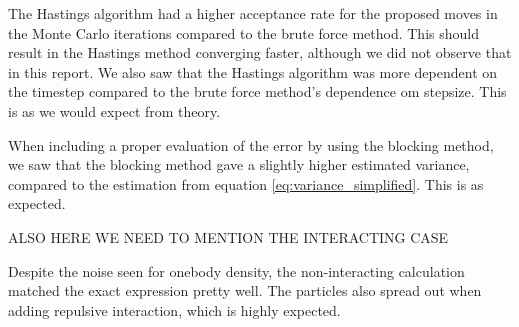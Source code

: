 \documentclass[norsk,a4paper,12pt]{article}
\begin{document}
The Hastings algorithm had a higher acceptance rate for the proposed moves in the Monte Carlo iterations compared to the brute force method. This should result in the Hastings method converging faster, although we did not observe that in this report. We also saw that the Hastings algorithm was more dependent on the timestep compared to the brute force method's dependence om stepsize. This is as we would expect from theory.  \par
When including a proper evaluation of the error by using the blocking method, we saw that the blocking method gave a slightly higher estimated variance, compared to the estimation from equation \ref{eq:variance_simplified}. This is as expected.

ALSO HERE WE NEED TO MENTION THE INTERACTING CASE

Despite the noise seen for onebody density, the non-interacting calculation matched the exact expression pretty well. The particles also spread out when adding repulsive interaction, which is highly expected. 




\newpage
\end{document}
